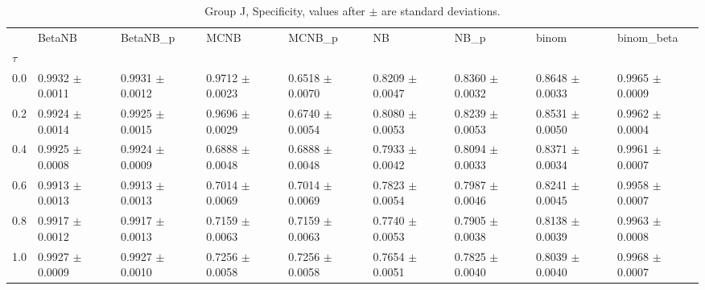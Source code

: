 \begin{table}[H]
\centering
\begin{adjustbox}{max width=\linewidth}
\begin{tabular}{lllllllll}
\toprule
 & BetaNB & BetaNB\_p & MCNB & MCNB\_p & NB & NB\_p & binom & binom\_beta \\
$\tau$ &  &  &  &  &  &  &  &  \\
\midrule
0.0 & 0.9932 $\pm$ 0.0011 & 0.9931 $\pm$ 0.0012 & 0.9712 $\pm$ 0.0023 & 0.6518 $\pm$ 0.0070 & 0.8209 $\pm$ 0.0047 & 0.8360 $\pm$ 0.0032 & 0.8648 $\pm$ 0.0033 & 0.9965 $\pm$ 0.0009 \\
0.2 & 0.9924 $\pm$ 0.0014 & 0.9925 $\pm$ 0.0015 & 0.9696 $\pm$ 0.0029 & 0.6740 $\pm$ 0.0054 & 0.8080 $\pm$ 0.0053 & 0.8239 $\pm$ 0.0053 & 0.8531 $\pm$ 0.0050 & 0.9962 $\pm$ 0.0004 \\
0.4 & 0.9925 $\pm$ 0.0008 & 0.9924 $\pm$ 0.0009 & 0.6888 $\pm$ 0.0048 & 0.6888 $\pm$ 0.0048 & 0.7933 $\pm$ 0.0042 & 0.8094 $\pm$ 0.0033 & 0.8371 $\pm$ 0.0034 & 0.9961 $\pm$ 0.0007 \\
0.6 & 0.9913 $\pm$ 0.0013 & 0.9913 $\pm$ 0.0013 & 0.7014 $\pm$ 0.0069 & 0.7014 $\pm$ 0.0069 & 0.7823 $\pm$ 0.0054 & 0.7987 $\pm$ 0.0046 & 0.8241 $\pm$ 0.0045 & 0.9958 $\pm$ 0.0007 \\
0.8 & 0.9917 $\pm$ 0.0012 & 0.9917 $\pm$ 0.0013 & 0.7159 $\pm$ 0.0063 & 0.7159 $\pm$ 0.0063 & 0.7740 $\pm$ 0.0053 & 0.7905 $\pm$ 0.0038 & 0.8138 $\pm$ 0.0039 & 0.9963 $\pm$ 0.0008 \\
1.0 & 0.9927 $\pm$ 0.0009 & 0.9927 $\pm$ 0.0010 & 0.7256 $\pm$ 0.0058 & 0.7256 $\pm$ 0.0058 & 0.7654 $\pm$ 0.0051 & 0.7825 $\pm$ 0.0040 & 0.8039 $\pm$ 0.0040 & 0.9968 $\pm$ 0.0007 \\
\bottomrule
\end{tabular}

\end{adjustbox}
\caption{Group J, Specificity, values after $\pm$ are standard deviations.}
\end{table}
